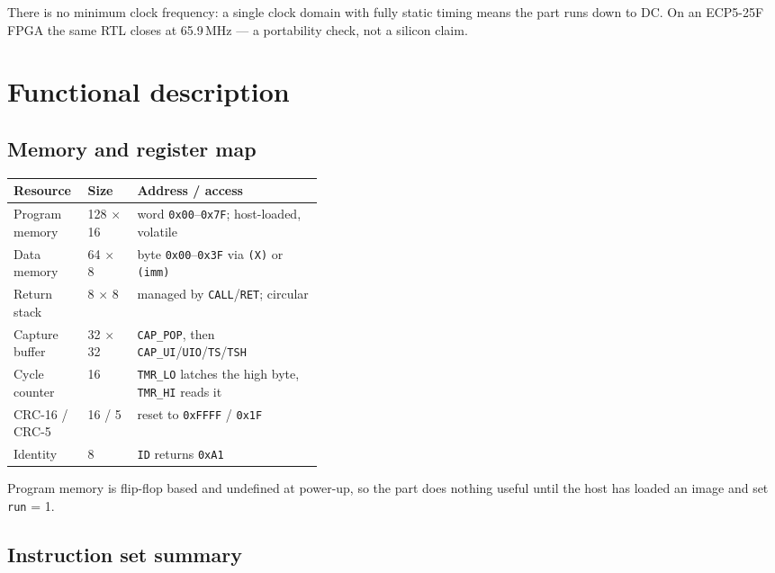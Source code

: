 \documentclass[10pt,a4paper]{article}
\begin{document}
There is no minimum clock frequency: a single clock domain with fully static
timing means the part runs down to DC. On an ECP5-25F FPGA the same RTL closes at
65.9\,MHz --- a portability check, not a silicon claim.

\section{Functional description}

\subsection{Memory and register map}

\begin{center}
\begin{tabularx}{\linewidth}{@{}L{0.24\linewidth}L{0.16\linewidth}X@{}}
\toprule
\textbf{Resource} & \textbf{Size} & \textbf{Address / access}\\
\midrule
Program memory & 128 \(\times\) 16 & word \texttt{0x00}--\texttt{0x7F}; host-loaded, volatile\\
Data memory & 64 \(\times\) 8 & byte \texttt{0x00}--\texttt{0x3F} via \texttt{(X)} or \texttt{(imm)}\\
Return stack & 8 \(\times\) 8 & managed by \texttt{CALL}/\texttt{RET}; circular\\
Capture buffer & 32 \(\times\) 32 & \texttt{CAP\_POP}, then \texttt{CAP\_UI}/\texttt{UIO}/\texttt{TS}/\texttt{TSH}\\
Cycle counter & 16 & \texttt{TMR\_LO} latches the high byte, \texttt{TMR\_HI} reads it\\
CRC-16 / CRC-5 & 16 / 5 & reset to \texttt{0xFFFF} / \texttt{0x1F}\\
Identity & 8 & \texttt{ID} returns \texttt{0xA1}\\
\bottomrule
\end{tabularx}
\end{center}

Program memory is flip-flop based and undefined at power-up, so the part does
nothing useful until the host has loaded an image and set \texttt{run} = 1.

\subsection{Instruction set summary}
\end{document}
